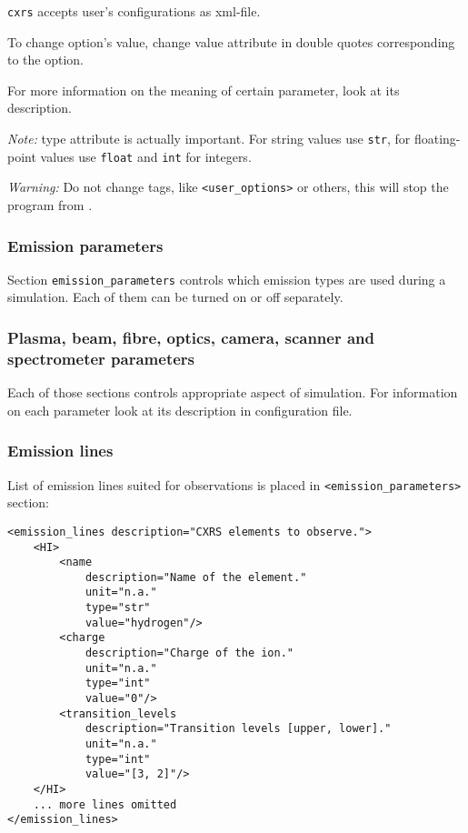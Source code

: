 \documentclass[../main.tex]{subfiles}
\begin{document}
\texttt{cxrs} accepts user's configurations as xml-file.

To change option's value, change value attribute in double quotes corresponding to the option.

For more information on the meaning of certain parameter, look at its description.

\emph{Note:} type attribute is actually important. For string values use \texttt{str}, for floating-point values use \texttt{float} and \texttt{int} for integers.

\emph{Warning:} Do not change tags, like \texttt{<user\_options>} or others, this will stop the program from .

\subsubsection{Emission parameters}

Section \texttt{emission\_parameters} controls which emission types are used during a simulation. Each of them can be turned on or off separately.

\subsubsection{Plasma, beam, fibre, optics, camera, scanner and spectrometer parameters}

Each of those sections controls appropriate aspect of simulation. For information on each parameter look at its description in configuration file.

\subsubsection{Emission lines}

List of emission lines suited for observations is placed in \texttt{<emission\_parameters>} section:

\begin{verbatim}
<emission_lines description="CXRS elements to observe.">
    <HI>
        <name
            description="Name of the element."
            unit="n.a."
            type="str"
            value="hydrogen"/>
        <charge
            description="Charge of the ion."
            unit="n.a."
            type="int"
            value="0"/>
        <transition_levels
            description="Transition levels [upper, lower]."
            unit="n.a."
            type="int"
            value="[3, 2]"/>
    </HI>
    ... more lines omitted
</emission_lines>
\end{verbatim}
\end{document}
